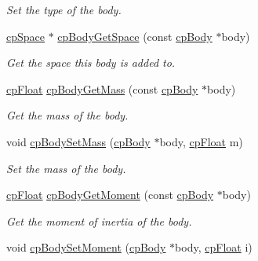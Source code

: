 \begin{DoxyCompactItemize}
\begin{DoxyCompactList}\small\item\em Set the type of the body. \end{DoxyCompactList}\item 
\hypertarget{group__cp_body_ga5331e16049cb927809a3a9ddefc94a46}{}\hyperlink{structcp_space}{cp\+Space} $\ast$ \hyperlink{group__cp_body_ga5331e16049cb927809a3a9ddefc94a46}{cp\+Body\+Get\+Space} (const \hyperlink{structcp_body}{cp\+Body} $\ast$body)\label{group__cp_body_ga5331e16049cb927809a3a9ddefc94a46}

\begin{DoxyCompactList}\small\item\em Get the space this body is added to. \end{DoxyCompactList}\item 
\hypertarget{group__cp_body_ga6860d2aa475d2f00781f149ec88b924a}{}\hyperlink{group__basic_types_gac1ed65573e035bf892505768c852d8d3}{cp\+Float} \hyperlink{group__cp_body_ga6860d2aa475d2f00781f149ec88b924a}{cp\+Body\+Get\+Mass} (const \hyperlink{structcp_body}{cp\+Body} $\ast$body)\label{group__cp_body_ga6860d2aa475d2f00781f149ec88b924a}

\begin{DoxyCompactList}\small\item\em Get the mass of the body. \end{DoxyCompactList}\item 
\hypertarget{group__cp_body_ga53196d6e67fdc55389418aebe0b8b127}{}void \hyperlink{group__cp_body_ga53196d6e67fdc55389418aebe0b8b127}{cp\+Body\+Set\+Mass} (\hyperlink{structcp_body}{cp\+Body} $\ast$body, \hyperlink{group__basic_types_gac1ed65573e035bf892505768c852d8d3}{cp\+Float} m)\label{group__cp_body_ga53196d6e67fdc55389418aebe0b8b127}

\begin{DoxyCompactList}\small\item\em Set the mass of the body. \end{DoxyCompactList}\item 
\hypertarget{group__cp_body_ga7c0556b9042415fde042affb9feccb0f}{}\hyperlink{group__basic_types_gac1ed65573e035bf892505768c852d8d3}{cp\+Float} \hyperlink{group__cp_body_ga7c0556b9042415fde042affb9feccb0f}{cp\+Body\+Get\+Moment} (const \hyperlink{structcp_body}{cp\+Body} $\ast$body)\label{group__cp_body_ga7c0556b9042415fde042affb9feccb0f}

\begin{DoxyCompactList}\small\item\em Get the moment of inertia of the body. \end{DoxyCompactList}\item 
\hypertarget{group__cp_body_ga39dd86643a700fb93198433174819d1a}{}void \hyperlink{group__cp_body_ga39dd86643a700fb93198433174819d1a}{cp\+Body\+Set\+Moment} (\hyperlink{structcp_body}{cp\+Body} $\ast$body, \hyperlink{group__basic_types_gac1ed65573e035bf892505768c852d8d3}{cp\+Float} i)\label{group__cp_body_ga39dd86643a700fb93198433174819d1a}


\end{DoxyCompactItemize}
